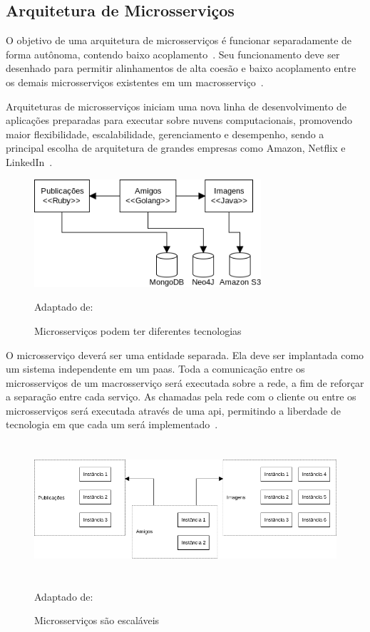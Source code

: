 \subsection{Arquitetura de Microsserviços}
\label{sec:microsservicos}
%
O objetivo de uma arquitetura de microsserviços é funcionar separadamente de forma autônoma, contendo baixo acoplamento~\cite{Newman2015Feb}.
%
Seu funcionamento deve ser desenhado para permitir alinhamentos de alta coesão e baixo acoplamento entre os demais microsserviços existentes em um macrosserviço~\cite{8169955}.



Arquiteturas de microsserviços iniciam uma nova linha de desenvolvimento de aplicações preparadas para executar sobre nuvens computacionais, promovendo maior flexibilidade, escalabilidade, gerenciamento e desempenho, sendo a principal escolha de arquitetura de grandes empresas como Amazon, Netflix e LinkedIn~\cite{7830692,7515686}.

\begin{figure}[htb!]
\caption{Microsserviços podem ter diferentes tecnologias}
\label{fig:microsservicos_tecnologias}
\includegraphics[height=4cm]{img/cap2/microsservicos_tecnologias.png}
\centering

Adaptado de:~\cite{Newman2015Feb}
\end{figure}

O microsserviço deverá ser uma entidade separada. Ela deve ser implantada como um sistema independente em um \ac{paas}.
%
Toda a comunicação entre os microsserviços de um macrosserviço será executada sobre a rede, a fim de reforçar a separação entre cada serviço.
%
As chamadas pela rede com o cliente ou entre os microsserviços será executada através de uma \ac{api}, permitindo a liberdade de tecnologia em que cada um será implementado~\cite{Newman2015Feb}.



\begin{figure}[htb!]
\caption{Microsserviços são escaláveis}
\label{fig:microsservicos_escalabilidade}
\includegraphics[height=5cm]{img/cap2/microsservicos_escalabilidade.png}
\centering

Adaptado de:~\cite{Newman2015Feb}
\end{figure}



